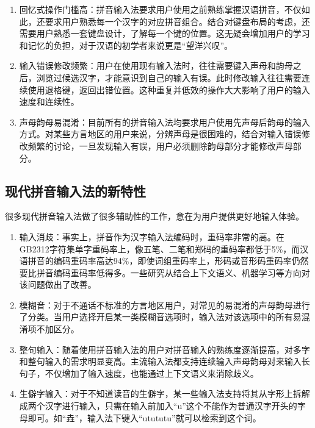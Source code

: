 \begin{enumerate}
  \item
  回忆式操作门槛高：拼音输入法要求用户使用之前熟练掌握汉语拼音，不仅如此，还要求用户熟悉每一个汉字的对应拼音组合。结合对键盘布局的考虑，还需要用户熟悉一套键盘设计，了解每一个键的位置。这无疑会增加用户的学习和记忆的负担，对于汉语的初学者来说更是“望洋兴叹”。

  \item
  输入错误修改频繁：用户在使用现有输入法时，往往需要键入声母和韵母之后，浏览过候选汉字，才能意识到自己的输入有误。此时修改输入往往需要连续使用退格键，返回出错位置。这种重复并低效的操作大大影响了用户的输入速度和连续性。

  \item
  声母韵母易混淆：目前所有的拼音输入法均要求用户使用先声母后韵母的输入方式。对某些方言地区的用户来说，分辨声母是很困难的，结合对输入错误修改频繁的讨论，一旦发现输入有误，用户必须删除韵母部分才能修改声母部分。
  \end{enumerate}

  \subsection{现代拼音输入法的新特性\label{sec:new_feature}}

  很多现代拼音输入法做了很多辅助性的工作，意在为用户提供更好地输入体验。

  \begin{enumerate}

  \item
  输入消歧：事实上，拼音作为汉字输入法编码时，重码率非常的高。在GB2312字符集单字重码率上，像五笔、二笔和郑码的重码率都低于5\%，而汉语拼音的编码重码率高达94\%，即使词组重码率上，形码或音形码重码率仍然要比拼音编码重码率低得多。一些研究从结合上下文语义、机器学习等方向对该问题做出了改善。\supercite{wen2008ambiguity, liu2002approach}

  \item
  模糊音：对于不通话不标准的方言地区用户，对常见的易混淆的声母韵母进行了分类。当用户选择开启某一类模糊音选项时，输入法对该选项中的所有易混淆项不加区分。

  \item
  整句输入：随着使用拼音输入法的用户对拼音输入的熟练度逐渐提高，对多字和整句输入的需求明显变高。主流输入法都支持连续输入声母韵母对来输入长句子，不仅增加了输入速度，也能通过上下文语义来消除歧义。

  \item
  生僻字输入：对于不知道读音的生僻字，某一些输入法支持将其从字形上拆解成两个汉字进行输入，只需在输入前加入“u”这个不能作为普通汉字开头的字母即可。如“垚”，输入法下键入“utututu”就可以检索到这个词。
  \end{enumerate}
